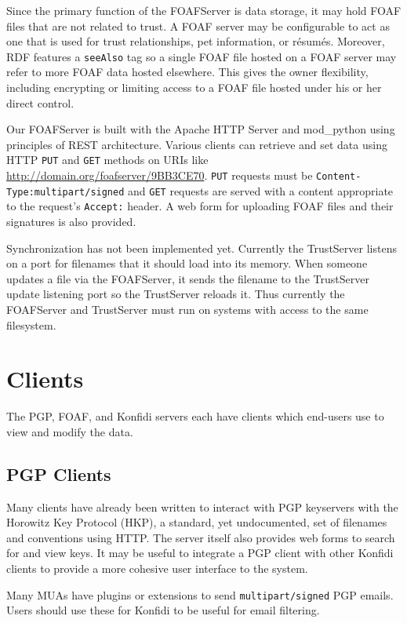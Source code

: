 \documentclass{acm_proc_article-sp}
\begin{document}
Since the primary function of the FOAFServer is data storage, it may hold FOAF files that are not related to trust.  A FOAF server may be configurable to act as one that is used for trust relationships, pet information, or r\'{e}sum\'{e}s.  Moreover, RDF features a \texttt{seeAlso} tag so a single FOAF file hosted on a FOAF server may refer to more FOAF data hosted elsewhere.  This gives the owner flexibility, including encrypting or limiting access to a FOAF file hosted under his or her direct control.

Our FOAFServer is built with the Apache HTTP Server and mod\_\-py\-thon using principles of REST architecture.  Various clients can retrieve and set data using HTTP \texttt{PUT} and \texttt{GET} methods on URIs like \url{http://domain.org/foafserver/9BB3CE70}.  \texttt{PUT} requests must be \texttt{Content-Type:multipart/signed} and \texttt{GET} requests are served with a content appropriate to the request's \texttt{Accept:} header.  A web form for uploading FOAF files and their signatures is also provided.

Synchronization has not been implemented yet.  Currently the TrustServer listens on a port for filenames that it should load into its memory.  When someone updates a file via the FOAFServer, it sends the filename to the TrustServer update listening port so the TrustServer reloads it.  Thus currently the FOAFServer and TrustServer must run on systems with access to the same filesystem.

\section{Clients}
The PGP, FOAF, and Konfidi servers each have clients which end-users use to view and modify the data.

\subsection{PGP Clients}
Many clients have already been written to interact with PGP keyservers with the Horowitz Key Protocol (HKP), a standard, yet undocumented, set of filenames and conventions using HTTP.  The server itself also provides web forms to search for and view keys.  It may be useful to integrate a PGP client with other Konfidi clients to provide a more cohesive user interface to the system.

Many MUAs have plugins or extensions to send \texttt{mul\-ti\-part/\-signed} PGP emails.  Users should use these for Konfidi to be useful for email filtering.
\end{document}
